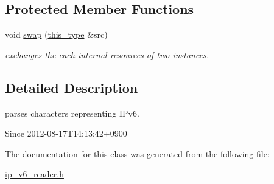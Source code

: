 \subsection*{Protected Member Functions}
\begin{DoxyCompactItemize}
\item 
\hypertarget{classhryky_1_1ip_1_1v6_1_1_reader_a3be869e8c8d146a682e1d9ac43f3891a}{void \hyperlink{classhryky_1_1ip_1_1v6_1_1_reader_a3be869e8c8d146a682e1d9ac43f3891a}{swap} (\hyperlink{classhryky_1_1ip_1_1v6_1_1_reader_a8e77e03500cfbbc0da2b0bc14f30c0d8}{this\-\_\-type} \&src)}\label{classhryky_1_1ip_1_1v6_1_1_reader_a3be869e8c8d146a682e1d9ac43f3891a}

\begin{DoxyCompactList}\small\item\em exchanges the each internal resources of two instances. \end{DoxyCompactList}\end{DoxyCompactItemize}


\subsection{Detailed Description}
parses characters representing I\-Pv6. 

\begin{DoxySince}{Since}
2012-\/08-\/17\-T14\-:13\-:42+0900 
\end{DoxySince}


The documentation for this class was generated from the following file\-:\begin{DoxyCompactItemize}
\item 
\hyperlink{ip__v6__reader_8h}{ip\-\_\-v6\-\_\-reader.\-h}\end{DoxyCompactItemize}
